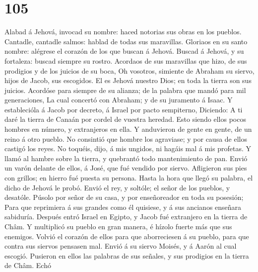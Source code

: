 \hypertarget{section-104}{%
\section{105}\label{section-104}}

 Alabad á Jehová, invocad su nombre: haced notorias sus
obras en los pueblos.  Cantadle, cantadle salmos: hablad
de todas sus maravillas.  Gloriaos en su santo nombre:
alégrese el corazón de los que buscan á Jehová.  Buscad á
Jehová, y su fortaleza: buscad siempre su rostro. 
Acordaos de sus maravillas que hizo, de sus prodigios y de los juicios
de su boca,  Oh vosotros, simiente de Abraham su siervo,
hijos de Jacob, sus escogidos.  El es Jehová nuestro Dios;
en toda la tierra son sus juicios.  Acordóse para siempre
de su alianza; de la palabra que mandó para mil generaciones,
 La cual concertó con Abraham; y de su juramento á Isaac.
 Y establecióla á Jacob por decreto, á Israel por pacto
sempiterno,  Diciendo: A ti daré la tierra de Canaán por
cordel de vuestra heredad.  Esto siendo ellos pocos
hombres en número, y extranjeros en ella.  Y anduvieron
de gente en gente, de un reino á otro pueblo.  No
consintió que hombre los agraviase; y por causa de ellos castigó los
reyes.  No toquéis, dijo, á mis ungidos, ni hagáis mal á
mis profetas.  Y llamó al hambre sobre la tierra, y
quebrantó todo mantenimiento de pan.  Envió un varón
delante de ellos, á José, que fué vendido por siervo. 
Afligieron sus pies con grillos; en hierro fué puesta su persona.
 Hasta la hora que llegó su palabra, el dicho de Jehová
le probó.  Envió el rey, y soltóle; el señor de los
pueblos, y desatóle.  Púsolo por señor de su casa, y por
enseñoreador en toda su posesión;  Para que reprimiera á
sus grandes como él quisiese, y á sus ancianos enseñara sabiduría.
 Después entró Israel en Egipto, y Jacob fué extranjero
en la tierra de Châm.  Y multiplicó su pueblo en gran
manera, é hízolo fuerte más que sus enemigos.  Volvió el
corazón de ellos para que aborreciesen á su pueblo, para que contra sus
siervos pensasen mal.  Envió á su siervo Moisés, y á
Aarón al cual escogió.  Pusieron en ellos las palabras de
sus señales, y sus prodigios en la tierra de Châm.  Echó
